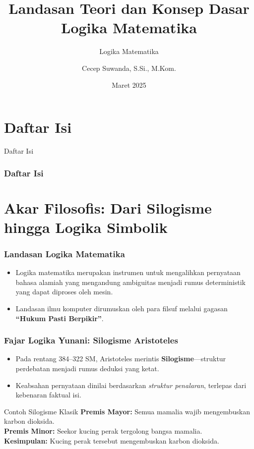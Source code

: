 \documentclass[handout]{beamer}
\subtitle[Logika Matematika]{Logika Matematika}
\title[Landasan Teori dan Konsep Dasar]{Landasan Teori dan Konsep Dasar Logika Matematika}
\author{Cecep Suwanda, S.Si., M.Kom.}
\date{Maret 2025}
\institute{Universitas Bale Bandung}
\theoremstyle{definition}
\theoremstyle{example}
\begin{document}
\maketitle

\section*{Daftar Isi}
\begin{frame}{Daftar Isi}
\frametitle{Daftar Isi}
\tableofcontents
\end{frame}

\section{Akar Filosofis: Dari Silogisme hingga Logika Simbolik}

\begin{frame}
\frametitle{Landasan Logika Matematika}
\begin{itemize}
  \item Logika matematika merupakan instrumen untuk mengalihkan pernyataan bahasa alamiah yang mengandung ambiguitas menjadi rumus deterministik yang dapat diproses oleh mesin.
  \item Landasan ilmu komputer dirumuskan oleh para filsuf melalui gagasan \textbf{``Hukum Pasti Berpikir''}.
\end{itemize}
\end{frame}

\begin{frame}
\frametitle{Fajar Logika Yunani: Silogisme Aristoteles}
\begin{itemize}
  \item Pada rentang 384--322 SM, Aristoteles merintis \textbf{Silogisme}---struktur perdebatan menjadi rumus deduksi yang ketat.
  \item Keabsahan pernyataan dinilai berdasarkan \textit{struktur penalaran}, terlepas dari kebenaran faktual isi.
\end{itemize}
\begin{block}{Contoh Silogisme Klasik}
  \textbf{Premis Mayor:} Semua mamalia wajib mengembuskan karbon dioksida.\\
  \textbf{Premis Minor:} Seekor kucing perak tergolong bangsa mamalia.\\
  \textbf{Kesimpulan:} Kucing perak tersebut mengembuskan karbon dioksida.
\end{block}
\end{frame}
\end{document}
